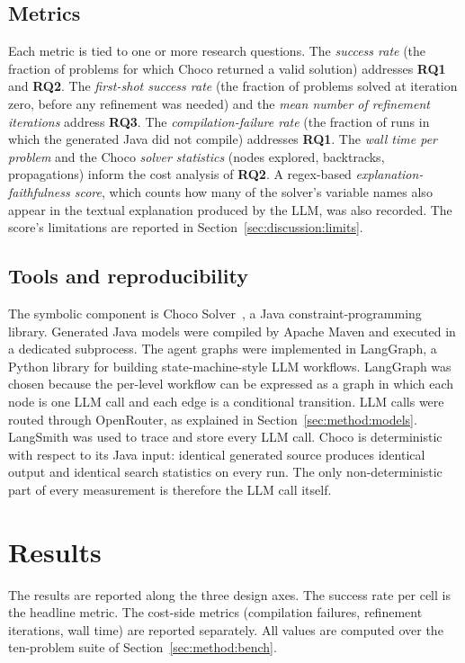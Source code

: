 \documentclass[11pt,a4paper]{article}
\newcommand{\rqone}{\textbf{RQ1}}
\newcommand{\rqtwo}{\textbf{RQ2}}
\newcommand{\rqthree}{\textbf{RQ3}}
\begin{document}
\subsection{Metrics}\label{sec:method:metrics}
Each metric is tied to one or more research questions. The \emph{success rate} (the fraction of problems for which Choco returned a valid solution) addresses \rqone{} and \rqtwo{}. The \emph{first-shot success rate} (the fraction of problems solved at iteration zero, before any refinement was needed) and the \emph{mean number of refinement iterations} address \rqthree{}. The \emph{compilation-failure rate} (the fraction of runs in which the generated Java did not compile) addresses \rqone{}. The \emph{wall time per problem} and the Choco \emph{solver statistics} (nodes explored, backtracks, propagations) inform the cost analysis of \rqtwo{}. A regex-based \emph{explanation-faithfulness score}, which counts how many of the solver's variable names also appear in the textual explanation produced by the LLM, was also recorded. The score's limitations are reported in Section~\ref{sec:discussion:limits}.

\subsection{Tools and reproducibility}\label{sec:method:tools}
The symbolic component is Choco Solver~\cite{R1}, a Java constraint-programming library. Generated Java models were compiled by Apache Maven and executed in a dedicated subprocess. The agent graphs were implemented in LangGraph, a Python library for building state-machine-style LLM workflows. LangGraph was chosen because the per-level workflow can be expressed as a graph in which each node is one LLM call and each edge is a conditional transition. LLM calls were routed through OpenRouter, as explained in Section~\ref{sec:method:models}. LangSmith was used to trace and store every LLM call. Choco is deterministic with respect to its Java input: identical generated source produces identical output and identical search statistics on every run. The only non-deterministic part of every measurement is therefore the LLM call itself.

\section{Results}\label{sec:results}

The results are reported along the three design axes. The success rate per cell is the headline metric. The cost-side metrics (compilation failures, refinement iterations, wall time) are reported separately. All values are computed over the ten-problem suite of Section~\ref{sec:method:bench}.
\end{document}
